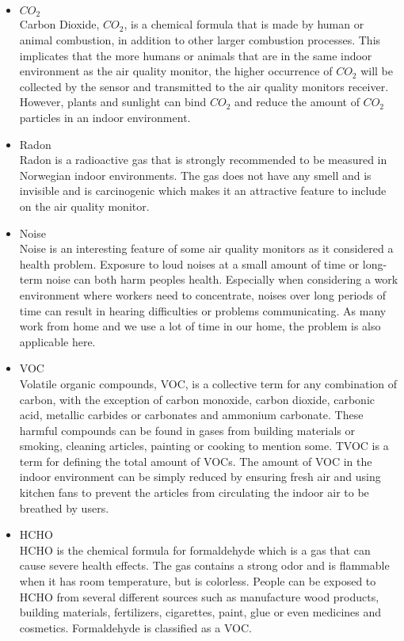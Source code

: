 \begin{itemize}
    \item \(CO_2\)\\
        Carbon Dioxide, \(CO_2\), is a chemical formula that is made by human or animal combustion, in addition to other larger combustion processes. \cite{CO2} This implicates that the more humans or animals that are in the same indoor environment as the air quality monitor, the higher occurrence of \(CO_2\) will be collected by the sensor and transmitted to the air quality monitors receiver. However, plants and sunlight can bind \(CO_2\) and reduce the amount of \(CO_2\) particles in an indoor environment. 
    \item Radon\\
        Radon is a radioactive gas that is strongly recommended to be measured in Norwegian indoor environments. \cite{Radon} The gas does not have any smell and is invisible and is carcinogenic which makes it an attractive feature to include on the air quality monitor. 
    \item Noise\\
        Noise is an interesting feature of some air quality monitors as it considered a health problem. \cite{Noise} Exposure to loud noises at a small amount of time or long-term noise can both harm peoples health. Especially when considering a work environment where workers need to concentrate, noises over long periods of time can result in hearing difficulties or problems communicating. As many work from home and we use a lot of time in our home, the problem is also applicable here. 
    \item VOC\\
        Volatile organic compounds, VOC, is a collective term for any combination of carbon, with the exception of carbon monoxide, carbon dioxide, carbonic acid, metallic carbides or carbonates and ammonium carbonate. \cite{VOC} These harmful compounds can be found in gases from building materials or smoking, cleaning articles, painting or cooking to mention some. TVOC is a term for defining the total amount of VOCs. The amount of VOC in the indoor environment can be simply reduced by ensuring fresh air and using kitchen fans to prevent the articles from circulating the indoor air to be breathed by users. \cite{RecommendedIAQ}
     \item HCHO\\
        HCHO is the chemical formula for formaldehyde which is a gas that can cause severe health effects. \cite{HCHO} The gas contains a strong odor and is flammable when it has room temperature, but is colorless. People can be exposed to HCHO from several different sources such as manufacture wood products, building materials, fertilizers, cigarettes, paint, glue or even medicines and cosmetics. Formaldehyde is classified as a VOC.

\end{itemize}
